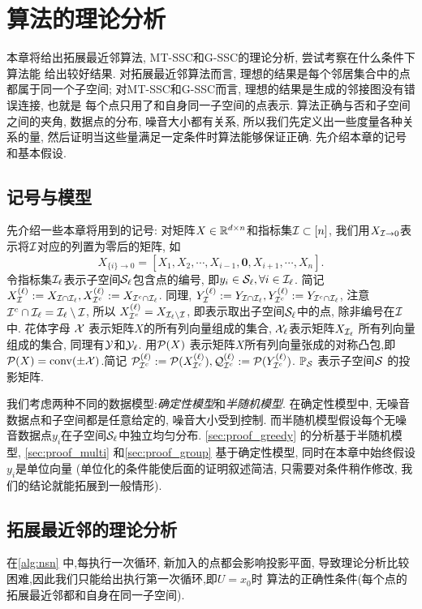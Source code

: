 \chapter{算法的理论分析}\label{chp:theory}
本章将给出拓展最近邻算法, MT-SSC和G-SSC的理论分析, 尝试考察在什么条件下算法能
给出较好结果. 对拓展最近邻算法而言, 理想的结果是每个邻居集合中的点都属于同一个子空间;
对MT-SSC和G-SSC而言, 理想的结果是生成的邻接图没有错误连接, 也就是
每个点只用了和自身同一子空间的点表示. 算法正确与否和子空间之间的夹角, 
数据点的分布, 噪音大小都有关系, 所以我们先定义出一些度量各种关系的量,
然后证明当这些量满足一定条件时算法能够保证正确. 先介绍本章的记号和基本假设.

\section{记号与模型}
先介绍一些本章将用到的记号:
对矩阵\(X\in\mathbb{R}^{d\times n}\)和指标集\(\mathcal{I} \subset [n]\),
我们用\(X_{\mathcal{I}\rightarrow 0}\)表示将\(\mathcal{I}\)对应的列置为零后的矩阵,
如
\[
  X_{\{i\}\rightarrow 0} = \left[ X_1, X_2, \cdots, X_{i-1}, \mathbf{0},
  X_{i+1}, \cdots, X_n \right].
\]
令指标集\(\mathcal{I}_\ell\)表示子空间\(\mathcal{S}_\ell\)包含点的编号,
即\(y_i\in \mathcal{S}_\ell, \forall i\in \mathcal{I}_\ell\).
简记\(X_{\mathcal{I}}^{(\ell)}:=X_{\mathcal{I}\cap\mathcal{I}_\ell}, X_{\mathcal{I}^c}^{(\ell)}:=X_{\mathcal{I}^c\cap \mathcal{I}_\ell}\).
同理, \(Y_{\mathcal{I}}^{(\ell)}:=Y_{\mathcal{I}\cap \mathcal{I}_\ell}, Y_{\mathcal{I}^c}^{(\ell)}:=Y_{\mathcal{I}^c\cap
\mathcal{I}_\ell}\),
注意 \(\mathcal{I}^c \cap \mathcal{I}_\ell = \mathcal{I}_\ell \setminus \mathcal{I}\), 所以
\(X_{\mathcal{I}^c}^{(\ell)} = X_{\mathcal{I}_\ell \setminus \mathcal{I}}\),
即表示取出子空间\(\mathcal{S}_\ell\)中的点, 除非编号在\(\mathcal{I}\)中.
花体字母 \(\mathcal{X}\) 表示矩阵\(X\)的所有列向量组成的集合, \(\mathcal{X}_\ell\)表示矩阵\(X_{\mathcal{I}_\ell}\)
所有列向量组成的集合, 同理有\(\mathcal{Y}\)和\(\mathcal{Y}_\ell\).
用\(\mathcal{P}(X)\) 表示矩阵\(X\)所有列向量张成的对称凸包,即
\(\mathcal{P}(X) = \mathrm{conv}(\pm \mathcal{X})\).简记
\(\mathcal{P}_{\mathcal{I}^c}^{(\ell)} := \mathcal{P}(X_{\mathcal{I}^c}^{(\ell)}),
\mathcal{Q}_{\mathcal{I}^c}^{(\ell)} :=\mathcal{P}(Y_{\mathcal{I}^c}^{(\ell)})\).
\(\mathbb{P}_{\mathcal{S}}\) 表示子空间\(\mathcal{S}\) 的投影矩阵.

我们考虑两种不同的数据模型:\emph{确定性模型}和\emph{半随机模型}\cite[1.4.1]{soltanolkotabi2012geometric}.
在确定性模型中, 无噪音数据点和子空间都是任意给定的, 噪音大小受到控制.
而半随机模型假设每个无噪音数据点\(y_i\)在子空间\(\mathcal{S}_\ell\)中独立均匀分布.
\autoref{sec:proof_greedy} 的分析基于半随机模型,
\autoref{sec:proof_multi} 和\autoref{sec:proof_group} 基于确定性模型,
同时在本章中始终假设\(y_i\)是单位向量 (单位化的条件能使后面的证明叙述简洁,
只需要对条件稍作修改, 我们的结论就能拓展到一般情形).

\section{拓展最近邻的理论分析}\label{sec:proof_greedy}
在\autoref{alg:nsn} 中,每执行一次循环, 新加入的点都会影响投影平面,
导致理论分析比较困难,因此我们只能给出执行第一次循环,即\(U=x_0\)时
算法的正确性条件(每个点的拓展最近邻都和自身在同一子空间).

